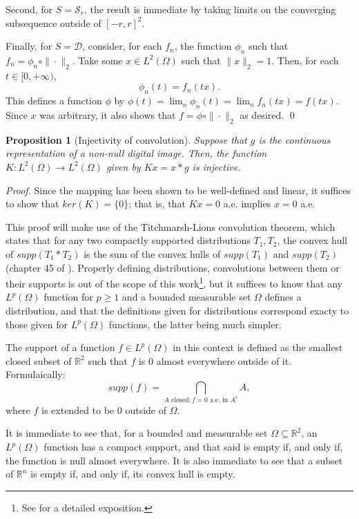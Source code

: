 \documentclass[twocolumn,twoside,a4paper,10pt]{IEEEtran}
\newtheorem{proposition}{Proposition}
\begin{document}
Second, for \(S=\mathcal{S}_r\), the result is immediate by taking limits on the converging subsequence outside of \([-r, r]^2\).

Finally, for \(S=\mathcal{D}\), consider, for each \(f_n\), the function \(\phi_n\) such that \(f_n=\phi_n \circ \|\cdot\|_{2}\). Take some \(x\in L^2(\Omega)\) such that \(\|x\|_{2}=1\). Then, for each \(t\in[0, +\infty)\),
\[
  \phi_n(t) = f_n(tx)
.\]
This defines a function \(\phi\) by \(\phi(t)=\lim_n\phi_n(t)=\lim_nf_n(tx)=f(tx)\). Since \(x\) was arbitrary, it also shows that \(f=\phi\circ\|\cdot\|_{2}\) as desired. \qed

\begin{proposition}[Injectivity of convolution]\label{prop:injectivity-of-convolution}
  Suppose that \(g\) is the continuous representation of a non-null digital image. Then, the function \(K\colon L^2(\Omega)\to L^2(\Omega)\) given by \(Kx = x\ast g\) is injective.
\end{proposition}
\textit{Proof. } Since the mapping has been shown to be well-defined and linear, it suffices to show that \(ker(K)=\{0\}\); that is, that \(Kx=0\) a.e. implies \(x=0\) a.e.

This proof will make use of the Titchmarsh-Lions convolution theorem, which states that for any two compactly supported distributions \(T_1, T_2\), the convex hull of \(supp(T_1\ast T_2)\) is the sum of the convex hulls of \(supp(T_1)\) and \(supp(T_2)\) (chapter 45 of \cite{donoghue1969distributions}). Properly defining distributions, convolutions between them or their supports is out of the scope of this work\footnote{See \cite{donoghue1969distributions} for a detailed exposition.}, but it suffices to know that any \(L^p(\Omega)\) function for \(p\geq 1\) and a bounded measurable set \(\Omega\) defines a distribution, and that the definitions given for distributions correspond exacty to those given for \(L^p(\Omega)\) functions, the latter being much simpler.

The support of a function \(f\in L^p(\Omega)\) in this context is defined as the smallest closed subset of \(\mathbb{R}^2\) such that \(f\) is \(0\) almost everywhere outside of it. Formulaically:
\[
  supp(f) = \bigcap_{A \text{ closed}, f=0 \text{ a.e. in } A^c}A
,\]
where \(f\) is extended to be \(0\) outside of \(\Omega\).

It is immediate to see that, for a bounded and measurable set \(\Omega\subseteq \mathbb{R}^2\), an \(L^p(\Omega)\) function has a compact support, and that said is empty if, and only if, the function is null almost everywhere. It is also immediate to see that a subset of \(\mathbb{R}^n\) is empty if, and only if, its convex hull is empty.
\end{document}
